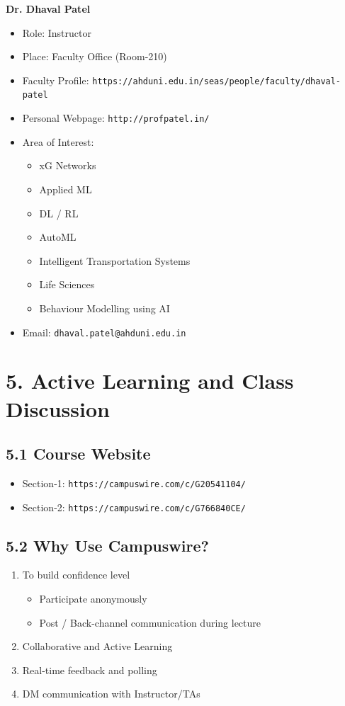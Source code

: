 \documentclass[11pt]{article}
\begin{document}
\textbf{Dr. Dhaval Patel}

\begin{itemize}
    \item Role: Instructor
    \item Place: Faculty Office (Room-210)
    \item Faculty Profile: \texttt{https://ahduni.edu.in/seas/people/faculty/dhaval-patel}
    \item Personal Webpage: \texttt{http://profpatel.in/}
    \item Area of Interest:
    \begin{itemize}
        \item xG Networks
        \item Applied ML
        \item DL / RL
        \item AutoML
        \item Intelligent Transportation Systems
        \item Life Sciences
        \item Behaviour Modelling using AI
    \end{itemize}
    \item Email: \texttt{dhaval.patel@ahduni.edu.in}
\end{itemize}

\section*{5. Active Learning and Class Discussion}

\subsection*{5.1 Course Website}

\begin{itemize}
    \item Section-1: \texttt{https://campuswire.com/c/G20541104/}
    \item Section-2: \texttt{https://campuswire.com/c/G766840CE/}
\end{itemize}

\subsection*{5.2 Why Use Campuswire?}

\begin{enumerate}
    \item To build confidence level
    \begin{itemize}
        \item Participate anonymously
        \item Post / Back-channel communication during lecture
    \end{itemize}
    \item Collaborative and Active Learning
    \item Real-time feedback and polling
    \item DM communication with Instructor/TAs
\end{enumerate}
\end{document}

